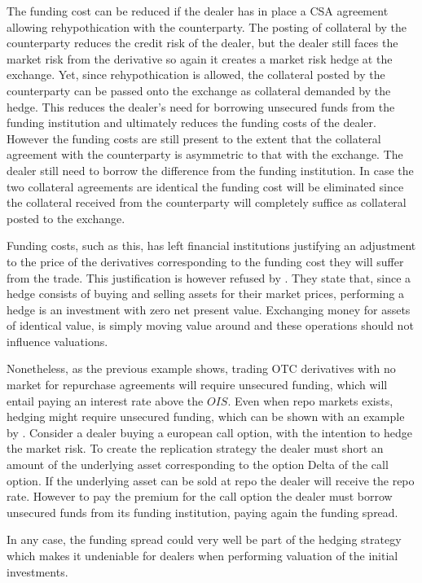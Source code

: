 \documentclass[../main.tex]{subfiles}
\begin{document}
        The funding cost can be reduced if the dealer has in place a CSA agreement allowing rehypothication with the counterparty. The posting of collateral by the counterparty reduces the credit risk of the dealer, but the dealer still faces the market risk from the derivative so again it creates a market risk hedge at the exchange. Yet, since rehypothication is allowed, the collateral posted by the counterparty can be passed onto the exchange as collateral demanded by the hedge. This reduces the dealer's need for borrowing unsecured funds from the funding institution and ultimately reduces the funding costs of the dealer. However the funding costs are still present to the extent that the collateral agreement with the counterparty is asymmetric to that with the exchange. The dealer still need to borrow the difference from the funding institution. In case the two collateral agreements are identical the funding cost will be eliminated since the collateral received from the counterparty will completely suffice as collateral posted to the exchange.

        Funding costs, such as this, has left financial institutions justifying an adjustment to the price of the derivatives corresponding to the funding cost they will suffer from the trade. This justification is however refused by \cite{HullWhite2012FVA}. They state that, since a hedge consists of buying and selling assets for their market prices, performing a hedge is an investment with zero net present value. Exchanging money for assets of identical value, is simply moving value around and these operations should not influence valuations. 

        Nonetheless, as the previous example shows, trading OTC derivatives with no market for repurchase agreements will require unsecured funding, which will entail paying an interest rate above the $OIS$. Even when repo markets exists, hedging might require unsecured funding, which can be shown with an example by \cite{Castagna2012FVA}. Consider a dealer buying a european call option, with the intention to hedge the market risk. To create the replication strategy the dealer must short an amount of the underlying asset corresponding to the option Delta of the call option. If the underlying asset can be sold at repo the dealer will receive the repo rate. However to pay the premium for the call option the dealer must borrow unsecured funds from its funding institution, paying again the funding spread. 

        In any case, the funding spread could very well be part of the hedging strategy which makes it undeniable for dealers when performing valuation of the initial investments.
\end{document}
